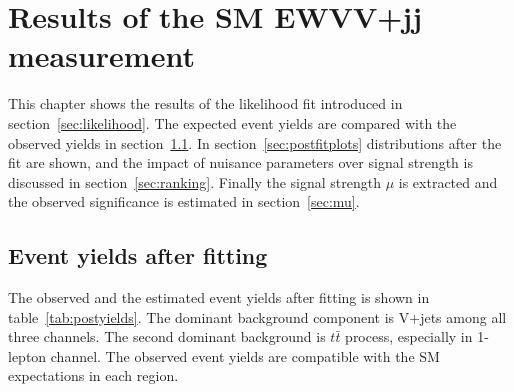 \chapter{Results of the SM EWVV+jj measurement}
\label{chap:results}
This chapter shows the results of the likelihood fit introduced in section~\ref{sec:likelihood}.
The expected event yields are compared with the observed yields in section~\ref{sec:eventyields}.
In section~\ref{sec:postfitplots} distributions after the fit are shown, and the impact of nuisance parameters over signal strength is discussed in section~\ref{sec:ranking}.
Finally the signal strength $\mu$ is extracted and the observed significance is estimated in section~\ref{sec:mu}.

\section{Event yields after fitting}
\label{sec:eventyields}

The observed and the estimated event yields after fitting is shown in table~\ref{tab:postyields}.
The dominant background component is V+jets among all three channels. The second dominant background is $t\bar{t}$ process, especially in 1-lepton channel. The observed event yields are compatible with the SM expectations in each region.

